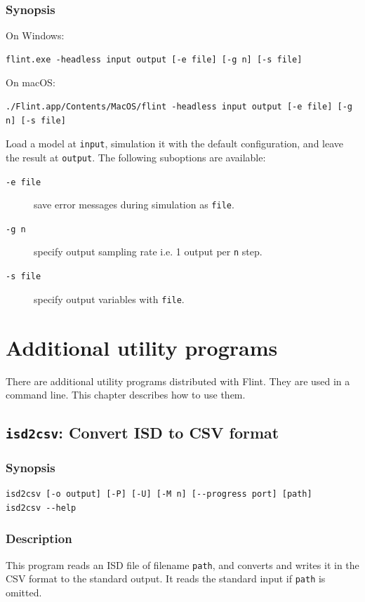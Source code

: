 \documentclass[a4paper,10pt]{report}
\begin{document}
\subsection{Synopsis}
\label{sec:org4698ff3}
On Windows:
\begin{verbatim}
flint.exe -headless input output [-e file] [-g n] [-s file]
\end{verbatim}
On macOS:
\begin{verbatim}
./Flint.app/Contents/MacOS/flint -headless input output [-e file] [-g n] [-s file]
\end{verbatim}
Load a model at \texttt{input}, simulation it with the default configuration,
and leave the result at \texttt{output}.
The following suboptions are available:

\begin{description}
\item[{\texttt{-e file}}] save error messages during simulation as \texttt{file}.
\item[{\texttt{-g n}}] specify output sampling rate i.e. 1 output per \texttt{n} step.
\item[{\texttt{-s file}}] specify output variables with \texttt{file}.
\end{description}

\chapter{Additional utility programs}
\label{sec:org0aad4c6}
There are additional utility programs distributed with Flint.
They are used in a command line.
This chapter describes how to use them.

\section{\texttt{isd2csv}: Convert ISD to CSV format}
\label{sec:org327fa19}

\subsection{Synopsis}
\label{sec:org85c94ba}
\begin{verbatim}
isd2csv [-o output] [-P] [-U] [-M n] [--progress port] [path]
isd2csv --help
\end{verbatim}

\subsection{Description}
\label{sec:org83d2f9a}
This program reads an ISD file of filename \texttt{path}, and converts and writes
it in the CSV format to the standard output.
It reads the standard input if \texttt{path} is omitted.
\end{document}
